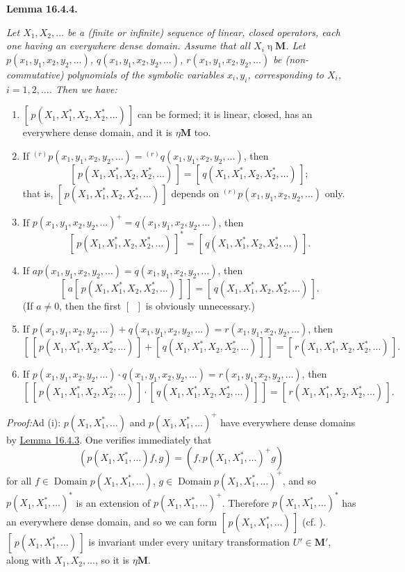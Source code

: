 \documentclass[12pt,b5paper,twoside]{article}
\newcommand{\M}{\mathbf M}
\newcommand{\clos}[1]{[\,#1\,]}
\newcommand{\Lemma}[1]{%
  \par\smallskip\noindent\phantomsection\label{lem:#1}\textbf{Lemma #1.}\enspace
}
\newcommand{\Proof}{\par\noindent\textit{Proof:}\enspace}
\newcommand{\lemref}[1]{\hyperref[lem:#1]{Lemma #1}}
\begin{document}
\Lemma{16.4.4}
{\itshape Let \(X_1,X_2,\ldots\) be a (finite or infinite) sequence of
linear, closed operators, each one having an everywhere dense domain. Assume
that all \(X_i\mathbin\eta\M\). Let
\(p(x_1,y_1,x_2,y_2,\ldots)\), \(q(x_1,y_1,x_2,y_2,\ldots)\),
\(r(x_1,y_1,x_2,y_2,\ldots)\) be (non-commutative) polynomials of the
symbolic variables \(x_i,y_i\), corresponding to \(X_i\),
\(i=1,2,\ldots\). Then we have:
\begin{enumerate}[label=(\roman*)]
\item \(\clos{p(X_1,X_1^*,X_2,X_2^*,\ldots)}\) can be formed; it is linear,
closed, has an everywhere dense domain, and it is \(\mathbin\eta\M\) too.
\item If \({}^{(r)}p(x_1,y_1,x_2,y_2,\ldots)
={}^{(r)}q(x_1,y_1,x_2,y_2,\ldots)\), then
\[
\clos{p(X_1,X_1^*,X_2,X_2^*,\ldots)}
=\clos{q(X_1,X_1^*,X_2,X_2^*,\ldots)};
\]
that is, \(\clos{p(X_1,X_1^*,X_2,X_2^*,\ldots)}\) depends on
\({}^{(r)}p(x_1,y_1,x_2,y_2,\ldots)\) only.
\item If \(p(x_1,y_1,x_2,y_2,\ldots)^+=q(x_1,y_1,x_2,y_2,\ldots)\), then
\[
\clos{p(X_1,X_1^*,X_2,X_2^*,\ldots)}^*
=\clos{q(X_1,X_1^*,X_2,X_2^*,\ldots)}.
\]
\item If \(ap(x_1,y_1,x_2,y_2,\ldots)=q(x_1,y_1,x_2,y_2,\ldots)\), then
\[
\clos{a\clos{p(X_1,X_1^*,X_2,X_2^*,\ldots)}}
=\clos{q(X_1,X_1^*,X_2,X_2^*,\ldots)}.
\]
(If \(a\ne0\), then the first \(\clos{\ }\) is obviously unnecessary.)
\item If \(p(x_1,y_1,x_2,y_2,\ldots)+q(x_1,y_1,x_2,y_2,\ldots)
=r(x_1,y_1,x_2,y_2,\ldots)\), then
\[
\clos{\clos{p(X_1,X_1^*,X_2,X_2^*,\ldots)}
      +\clos{q(X_1,X_1^*,X_2,X_2^*,\ldots)}}
=\clos{r(X_1,X_1^*,X_2,X_2^*,\ldots)}.
\]
\item If \(p(x_1,y_1,x_2,y_2,\ldots)\cdot q(x_1,y_1,x_2,y_2,\ldots)
=r(x_1,y_1,x_2,y_2,\ldots)\), then
\[
\clos{\clos{p(X_1,X_1^*,X_2,X_2^*,\ldots)}
      \cdot\clos{q(X_1,X_1^*,X_2,X_2^*,\ldots)}}
=\clos{r(X_1,X_1^*,X_2,X_2^*,\ldots)}.
\]
\end{enumerate}}

\Proof Ad (i): \(p(X_1,X_1^*,\ldots)\) and
\(p(X_1,X_1^*,\ldots)^+\) have everywhere dense domains by
\lemref{16.4.3}. One verifies immediately that
\[
(p(X_1,X_1^*,\ldots)f,g)
=(f,p(X_1,X_1^*,\ldots)^+g)
\]
for all \(f\in\operatorname{Domain}p(X_1,X_1^*,\ldots)\),
\(g\in\operatorname{Domain}p(X_1,X_1^*,\ldots)^+\), and so
\(p(X_1,X_1^*,\ldots)^*\) is an extension of
\(p(X_1,X_1^*,\ldots)^+\). Therefore
\(p(X_1,X_1^*,\ldots)^*\) has an everywhere dense domain, and so we can form
\(\clos{p(X_1,X_1^*,\ldots)}\) (cf. \cite[p.~300]{ref21}).
\(\clos{p(X_1,X_1^*,\ldots)}\) is invariant under every unitary
transformation \(U'\in\M'\), along with \(X_1,X_2,\ldots\), so it is
\(\mathbin\eta\M\).
\end{document}
